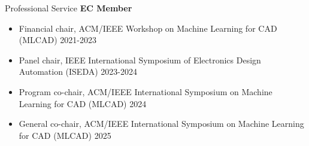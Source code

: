 \begin{rSection}{Professional Service}
\textbf{EC Member}
\begin{itemize}
    \item Financial chair, ACM/IEEE Workshop on Machine Learning for CAD (MLCAD) 2021-2023 
    \item Panel chair, IEEE International Symposium of Electronics Design Automation (ISEDA) 2023-2024
    \item Program co-chair, ACM/IEEE International Symposium on Machine Learning for CAD (MLCAD) 2024
    \item General co-chair, ACM/IEEE International Symposium on Machine Learning for CAD (MLCAD) 2025
\end{itemize}

\end{rSection}

